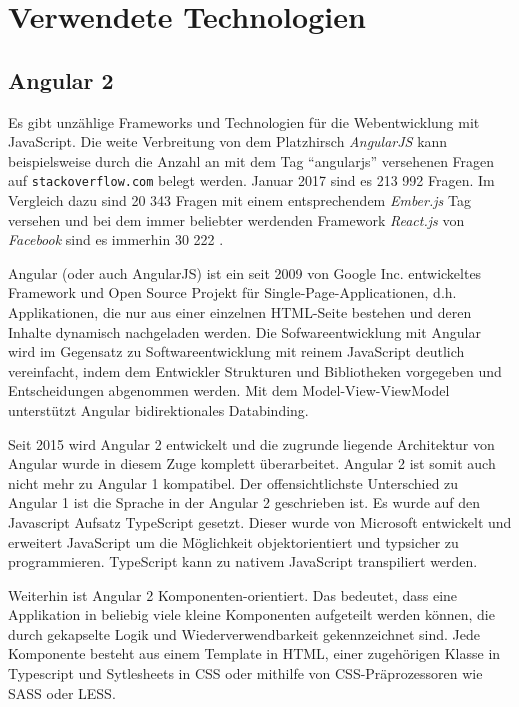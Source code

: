 \chapter{Verwendete Technologien}
\label{Verwendete Technologien}

\section{Angular 2}
Es gibt unzählige Frameworks und Technologien für die Webentwicklung mit Java\-Script. Die weite Verbreitung von dem Platzhirsch \emph{AngularJS} kann beispielsweise durch die Anzahl an mit dem Tag "`angularjs"' versehenen Fragen auf \texttt{stackoverflow.com} belegt werden. Januar 2017 sind es 213 992 Fragen. Im Vergleich dazu sind 20 343 Fragen mit einem entsprechendem \emph{Ember.js} Tag versehen und bei dem immer beliebter werdenden Framework \emph{React.js} von \emph{Facebook} sind es immerhin 30 222 \cite{stackoverflow}.

Angular (oder auch AngularJS) ist ein seit 2009 von Google Inc. entwickeltes Framework und Open Source Projekt für Single-Page-Applicationen, d.h. Applikationen, die nur aus einer einzelnen HTML-Seite bestehen und deren Inhalte dynamisch nachgeladen werden. Die Sofwareentwicklung mit Angular wird im Gegensatz zu Softwareentwicklung mit reinem JavaScript deutlich vereinfacht, indem dem Entwickler Strukturen und Bibliotheken vorgegeben und Entscheidungen abgenommen werden. Mit dem Model-View-ViewModel unterstützt Angular bidirektionales Databinding.

Seit 2015 wird Angular 2 entwickelt und die zugrunde liegende Architektur von Angular wurde in diesem Zuge komplett überarbeitet. Angular 2 ist somit auch nicht mehr zu Angular 1 kompatibel. Der offensichtlichste Unterschied zu Angular 1 ist die Sprache in der Angular 2 geschrieben ist. Es wurde auf den Javascript Aufsatz TypeScript gesetzt. Dieser wurde von Microsoft entwickelt und erweitert JavaScript um die Möglichkeit objektorientiert und typsicher zu programmieren. TypeScript kann zu nativem JavaScript transpiliert werden.

Weiterhin ist Angular 2 Komponenten-orientiert. Das bedeutet, dass eine Applikation in beliebig viele kleine Komponenten aufgeteilt werden können, die durch gekapselte Logik und Wiederverwendbarkeit gekennzeichnet sind. Jede Komponente besteht aus einem Template in HTML, einer zugehörigen Klasse in Typescript und Sytlesheets in CSS oder mithilfe von CSS-Präprozessoren wie SASS oder LESS.

